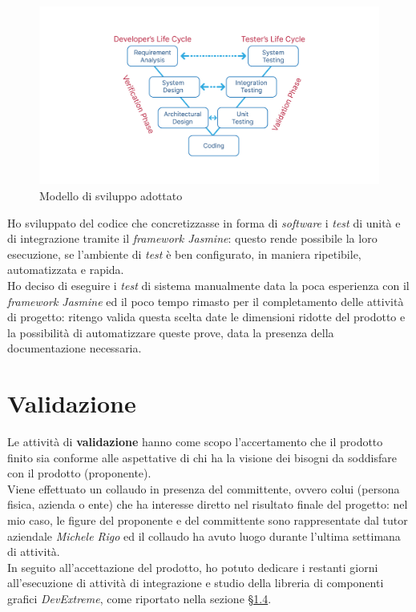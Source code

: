 \begin{figure}[H]
    \centering
    \includegraphics[width=\textwidth]{images/v-model.jpg}
    \caption[Modello di sviluppo del prodotto adottato]{Modello di sviluppo adottato\footnotemark}
\end{figure}
Ho sviluppato del codice che concretizzasse in forma di \textit{software} i \textit{test} di unità e di integrazione tramite il \textit{framework Jasmine}: questo rende possibile la loro esecuzione, se l'ambiente di \textit{test} è ben configurato, in maniera ripetibile, automatizzata e rapida. \\
Ho deciso di eseguire i \textit{test} di sistema manualmente data la poca esperienza con il \textit{framework Jasmine} ed il poco tempo rimasto per il completamento delle attività di progetto: ritengo valida questa scelta date le dimensioni ridotte del prodotto e la possibilità di automatizzare queste prove, data la presenza della documentazione necessaria.

\section{Validazione}
Le attività di \textbf{validazione} hanno come scopo l'accertamento che il prodotto finito sia conforme alle aspettative di chi ha la visione dei bisogni da soddisfare con il prodotto (proponente). \\
Viene effettuato un collaudo in presenza del committente, ovvero colui (persona fisica, azienda o ente) che ha interesse diretto nel risultato finale del progetto: nel mio caso, le figure del proponente e del committente sono rappresentate dal tutor aziendale \textit{Michele Rigo} ed il collaudo
ha avuto luogo durante l'ultima settimana di attività. \\
In seguito all'accettazione del prodotto, ho potuto dedicare i restanti giorni all'esecuzione di attività di integrazione e studio della libreria di componenti grafici \textit{DevExtreme}, come riportato nella sezione \hyperref[sec:innovazione]{§1.4}.


